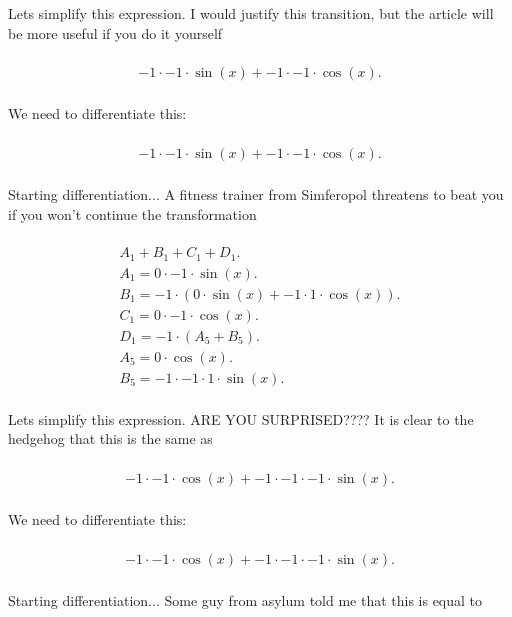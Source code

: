 \documentclass[12pt,a4paper]{extreport}
\begin{document}
Lets simplify this expression.
I would justify this transition, but the article will be more useful if you do it yourself 

\begin{multline}
\\
-1 \cdot -1 \cdot \sin(x) + -1 \cdot -1 \cdot \cos(x).\\
\end{multline}


We need to differentiate this:


\begin{multline}
\\
-1 \cdot -1 \cdot \sin(x) + -1 \cdot -1 \cdot \cos(x).\\
\end{multline}


Starting differentiation... 
A fitness trainer from Simferopol\cite{SJ} threatens to beat you if you won't continue the transformation 

\begin{multline}
\\
A_{1} + B_{1} + C_{1} + D_{1}.\\
A_{1} = 0 \cdot -1 \cdot \sin(x).\\
B_{1} = -1 \cdot (0 \cdot \sin(x) + -1 \cdot 1 \cdot \cos(x)).\\
C_{1} = 0 \cdot -1 \cdot \cos(x).\\
D_{1} = -1 \cdot (A_{5} + B_{5}).\\
A_{5} = 0 \cdot \cos(x).\\
B_{5} = -1 \cdot -1 \cdot 1 \cdot \sin(x).\\
\end{multline}


Lets simplify this expression.
ARE YOU SURPRISED????\cite{Dashkov} It is clear to the hedgehog that this is the same as 

\begin{multline}
\\
-1 \cdot -1 \cdot \cos(x) + -1 \cdot -1 \cdot -1 \cdot \sin(x).\\
\end{multline}


We need to differentiate this:


\begin{multline}
\\
-1 \cdot -1 \cdot \cos(x) + -1 \cdot -1 \cdot -1 \cdot \sin(x).\\
\end{multline}


Starting differentiation... 
Some guy from asylum \cite{Anton} told me that this is equal to 
\end{document}
